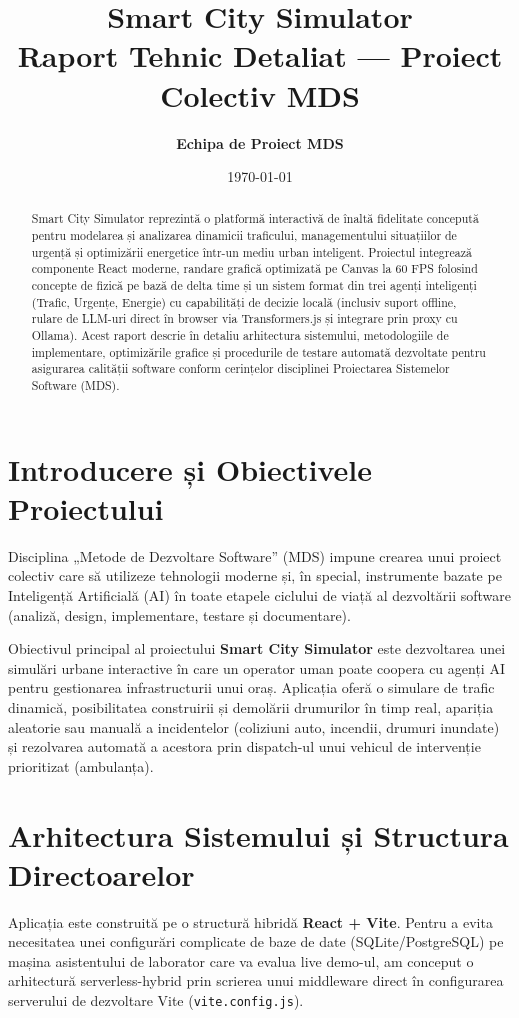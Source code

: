 \documentclass[12pt,a4paper]{article}
\title{\textbf{Smart City Simulator}\\Raport Tehnic Detaliat --- Proiect Colectiv MDS}
\author{\textbf{Echipa de Proiect MDS}}
\date{\today}
\begin{document}
\maketitle

\begin{abstract}
Smart City Simulator reprezintă o platformă interactivă de înaltă fidelitate concepută pentru modelarea și analizarea dinamicii traficului, managementului situațiilor de urgență și optimizării energetice într-un mediu urban inteligent. Proiectul integrează componente React moderne, randare grafică optimizată pe Canvas la 60 FPS folosind concepte de fizică pe bază de delta time și un sistem format din trei agenți inteligenți (Trafic, Urgențe, Energie) cu capabilități de decizie locală (inclusiv suport offline, rulare de LLM-uri direct în browser via Transformers.js și integrare prin proxy cu Ollama). Acest raport descrie în detaliu arhitectura sistemului, metodologiile de implementare, optimizările grafice și procedurile de testare automată dezvoltate pentru asigurarea calității software conform cerințelor disciplinei Proiectarea Sistemelor Software (MDS).
\end{abstract}

\tableofcontents
\newpage

\section{Introducere și Obiectivele Proiectului}
Disciplina „Metode de Dezvoltare Software” (MDS) impune crearea unui proiect colectiv care să utilizeze tehnologii moderne și, în special, instrumente bazate pe Inteligență Artificială (AI) în toate etapele ciclului de viață al dezvoltării software (analiză, design, implementare, testare și documentare). 

Obiectivul principal al proiectului \textbf{Smart City Simulator} este dezvoltarea unei simulări urbane interactive în care un operator uman poate coopera cu agenți AI pentru gestionarea infrastructurii unui oraș. Aplicația oferă o simulare de trafic dinamică, posibilitatea construirii și demolării drumurilor în timp real, apariția aleatorie sau manuală a incidentelor (coliziuni auto, incendii, drumuri inundate) și rezolvarea automată a acestora prin dispatch-ul unui vehicul de intervenție prioritizat (ambulanța).

\section{Arhitectura Sistemului și Structura Directoarelor}
Aplicația este construită pe o structură hibridă \textbf{React + Vite}. Pentru a evita necesitatea unei configurări complicate de baze de date (SQLite/PostgreSQL) pe mașina asistentului de laborator care va evalua live demo-ul, am conceput o arhitectură serverless-hybrid prin scrierea unui middleware direct în configurarea serverului de dezvoltare Vite (\texttt{vite.config.js}).
\end{document}

